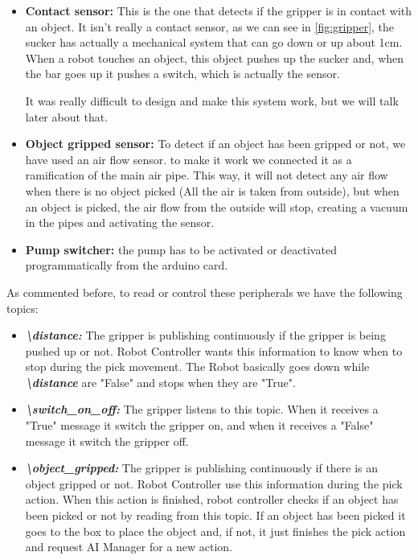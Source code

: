 			\begin{itemize}
				\item[\textendash]\textbf{Contact sensor:} This is the one that detects if the gripper is in contact with an object. It isn't really a contact sensor, as we can see in \autoref{fig:gripper}, the sucker has actually a mechanical system that can go down or up about 1cm. When a robot touches an object, this object pushes up the sucker and, when the bar goes up it pushes a switch, which is actually the sensor.
				
				It was really difficult to design and make this system work, but we will talk later about that.
				\item[\textendash]\textbf{Object gripped sensor:} To detect if an object has been gripped or not, we have used an air flow sensor. to make it work we connected it as a ramification of the main air pipe. This way, it will not detect any air flow when there is no object picked (All the air is taken from outside), but when an object is picked, the air flow from the outside will stop, creating a vacuum in the pipes and activating the sensor.
				\item[\textendash]\textbf{Pump switcher:} the pump has to be activated or deactivated programmatically from the arduino card.
			\end{itemize}
		
			As commented before, to read or control these peripherals we have the following topics:
			
			\begin{itemize}
				\item[\textendash]\textbf{\textit{\textbackslash distance: }} The gripper is publishing continuously if the gripper is being pushed up or not. Robot Controller wants this information to know when to stop during the pick movement. The Robot basically goes down while \textbf{\textit{\textbackslash distance}} are "False" and stops when they are "True".
				\item[\textendash]\textbf{\textit{\textbackslash switch\_on\_off: }} The gripper listens to this topic. When it receives a "True" message it switch the gripper on, and when it receives a "False" message it switch the gripper off.
				\item[\textendash]\textbf{\textit{\textbackslash object\_gripped: }} The gripper is publishing continuously if there is an object gripped or not. Robot Controller use this information during the pick action. When this action is finished, robot controller checks if an object has been picked or not by reading from this topic. If an object has been picked it goes to the box to place the object and, if not, it just finishes the pick action and request AI Manager for a new action.
			\end{itemize}
		
